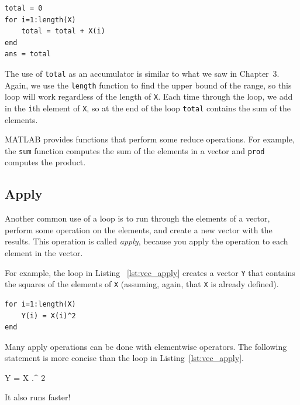 \begin{lstlisting}[caption={Reducing a vector to a single scalar value (the sum)}, label={lst:vec_reduce}]
total = 0
for i=1:length(X)
    total = total + X(i)
end
ans = total
\end{lstlisting}

The use of \lstinline{total} as an accumulator is similar to what we
saw in Chapter~3.  Again, we use the \lstinline{length} function
to find the upper bound of the range, so this loop will work
regardless of the length of \lstinline{X}.
Each time through the loop, we add
in the \lstinline{i}th element of \lstinline{X}, so at the end of the loop
\lstinline{total} contains the sum of the elements.


MATLAB provides functions that perform some reduce operations.
For example, the \lstinline{sum} function computes the sum of the elements
in a vector and \lstinline{prod} computes the product.


\subsection{Apply}
\label{apply}

Another common use of a loop is to run through the elements of
a vector, perform some operation on the elements, and create
a new vector with the results.  This operation is called
\emph{apply}, because you apply the operation to each element in
the vector.


For example, the loop in Listing ~\ref{lst:vec_apply} creates a vector \lstinline{Y} that
contains the squares of the elements of \lstinline{X} (assuming, again, that \lstinline{X} is already defined).

\begin{lstlisting}[caption={Making a new vector Y by squaring the elements in X}, label={lst:vec_apply}]
for i=1:length(X)
    Y(i) = X(i)^2
end
\end{lstlisting}

Many apply operations can be done with elementwise operators.
The following statement is more concise than the loop in
Listing~\ref{lst:vec_apply}.

\begin{code}
Y = X .^ 2
\end{code}

It also runs faster!


